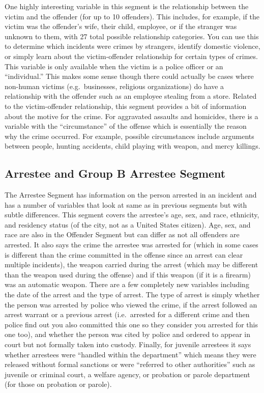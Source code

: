 \documentclass[
]{krantz}
\begin{document}
One highly interesting variable in this segment is the
relationship between the victim and the offender (for up to
10 offenders). This includes, for example, if the victim was
the offender's wife, their child, employee, or if the
stranger was unknown to them, with 27 total possible
relationship categories. You can use this to determine which
incidents were crimes by strangers, identify domestic
violence, or simply learn about the victim-offender
relationship for certain types of crimes. This variable is
only available when the victim is a police officer or an
``individual.'' This makes some sense though there could
actually be cases where non-human victims (e.g.~businesses,
religious organizations) do have a relationship with the
offender such as an employee stealing from a store. Related
to the victim-offender relationship, this segment provides a
bit of information about the motive for the crime. For
aggravated assaults and homicides, there is a variable with
the ``circumstance'' of the offense which is essentially the
reason why the crime occurred. For example, possible
circumstances include arguments between people, hunting
accidents, child playing with weapon, and mercy killings.

\subsection{Arrestee and Group B Arrestee
Segment}\label{arrestee-and-group-b-arrestee-segment}

The Arrestee Segment has information on the person arrested
in an incident and has a number of variables that look at
same as in previous segments but with subtle differences.
This segment covers the arrestee's age, sex, and race,
ethnicity, and residency status (of the city, not as a
United States citizen). Age, sex, and race are also in the
Offender Segment but can differ as not all offenders are
arrested. It also says the crime the arrestee was arrested
for (which in some cases is different than the crime
committed in the offense since an arrest can clear multiple
incidents), the weapon carried during the arrest (which may
be different than the weapon used during the offense) and if
this weapon (if it is a firearm) was an automatic weapon.
There are a few completely new variables including the date
of the arrest and the type of arrest. The type of arrest is
simply whether the person was arrested by police who viewed
the crime, if the arrest followed an arrest warrant or a
previous arrest (i.e.~arrested for a different crime and
then police find out you also committed this one so they
consider you arrested for this one too), and whether the
person was cited by police and ordered to appear in court
but not formally taken into custody. Finally, for juvenile
arrestees it says whether arrestees were ``handled within
the department'' which means they were released without
formal sanctions or were ``referred to other authorities''
such as juvenile or criminal court, a welfare agency, or
probation or parole department (for those on probation or
parole).
\end{document}
